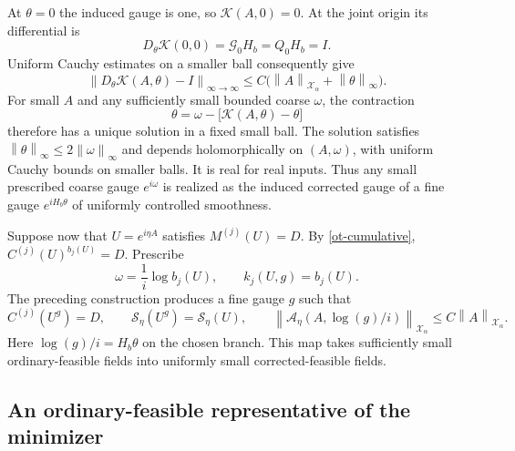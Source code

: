 \documentclass[11pt]{article}
\theoremstyle{remark}
\newcommand{\norm}[1]{\left\|#1\right\|}
\begin{document}
At $\theta=0$ the induced gauge is one, so
$\mathcal K(A,0)=0$. At the joint origin its differential is
\begin{equation}\label{ot-K-linear}
 D_\theta\mathcal K(0,0)=\mathcal G_0H_b=Q_0H_b=I.
\end{equation}
Uniform Cauchy estimates on a smaller ball consequently give
\begin{equation}\label{ot-K-near-identity}
 \norm{D_\theta\mathcal K(A,\theta)-I}_{\infty\to\infty}
       \le C\bigl(\norm{A}_{\mathcal X_\alpha}
                                    +\norm{\theta}_\infty\bigr).
\end{equation}
For small $A$ and any sufficiently small bounded coarse
$\omega$, the contraction
\[
 \theta=\omega-\bigl[\mathcal K(A,\theta)-\theta\bigr]
\]
therefore has a unique solution in a fixed small ball.
The solution satisfies $\norm{\theta}_\infty\le2\norm{\omega}_\infty$
and depends holomorphically on $(A,\omega)$, with uniform
Cauchy bounds on smaller balls. It is real for real inputs.
Thus any small prescribed coarse gauge $e^{i\omega}$ is
realized as the induced corrected gauge of a fine gauge
$e^{iH_b\theta}$ of uniformly controlled smoothness.

Suppose now that $U=e^{i\eta A}$ satisfies
$M^{(j)}(U)=D$. By \eqref{ot-cumulative},
$C^{(j)}(U)^{b_j(U)}=D$. Prescribe
\[
 \omega=\frac1i\log b_j(U),\qquad k_j(U,g)=b_j(U).
\]
The preceding construction produces a fine gauge $g$ such that
\begin{equation}\label{ot-ordinary-to-corrected}
 C^{(j)}(U^g)=D,\qquad
 \mathcal S_\eta(U^g)=\mathcal S_\eta(U),\qquad
 \norm{\mathscr A_\eta(A,\log(g)/i)}_{\mathcal X_\alpha}
                     \le C\norm{A}_{\mathcal X_\alpha}.
\end{equation}
Here $\log(g)/i=H_b\theta$ on the chosen branch. This map
takes sufficiently small ordinary-feasible fields into
uniformly small corrected-feasible fields.

\subsection{An ordinary-feasible representative of the minimizer}
\end{document}

